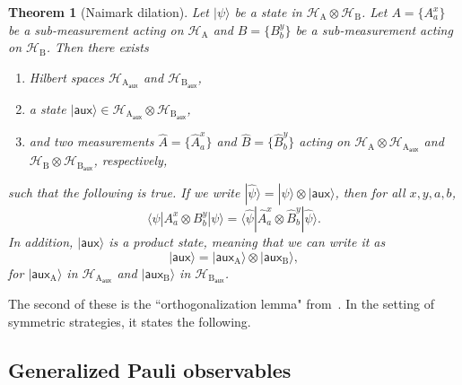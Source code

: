 \documentclass[11pt]{article}
\newtheorem{theorem}{Theorem}[section]
\theoremstyle{definition}
\newcommand{\ket}[1]{|#1\rangle}
\newcommand{\bra}[1]{\langle#1|}
\newcommand{\ot}{\otimes}
\newcommand{\mH}{\ensuremath{\mathcal{H}}}
\begin{document}
\begin{theorem}[Naimark dilation]\label{thm:naimark}
Let $\ket{\psi}$ be a state in $\mH_{\mathrm{A}} \ot \mH_{\mathrm{B}}$.
Let $A = \{A^x_a\}$ be a sub-measurement acting on $\mH_{\mathrm{A}}$
and $B=\{B^y_b\}$ be a sub-measurement acting on $\mH_{\mathrm{B}}$.
Then there exists
\begin{enumerate}
\item Hilbert spaces $\mH_{\mathrm{A}_{\mathsf{aux}}}$ and $\mH_{\mathrm{B}_{\mathsf{aux}}}$,
\item a state $\ket{\mathsf{aux}} \in \mH_{\mathrm{A}_{\mathsf{aux}}} \ot \mH_{\mathrm{B}_{\mathsf{aux}}}$,
\item and two measurements  $\widehat{A} = \{\widehat{A}^x_a\}$ and $\widehat{B}=\{\widehat{B}^y_b\}$
acting on $\mH_{\mathrm{A}} \ot \mH_{\mathrm{A}_{\mathsf{aux}}}$
and $\mH_{\mathrm{B}} \ot \mH_{\mathrm{B}_{\mathsf{aux}}}$,
respectively,
\end{enumerate}
such that the following is true.
If we write $\ket{\widehat{\psi}} = \ket{\psi} \otimes \ket{\mathsf{aux}}$,
then for all $x,y, a, b$,
 \begin{equation*}
 \bra{\psi} A^x_a \ot B^y_b \ket{\psi}
 = \bra{\widehat{\psi}} \widehat{A}^x_a \ot \widehat{B}^y_b \ket{\widehat{\psi}}.
 \end{equation*}
 In addition, $\ket{\mathsf{aux}}$ is a \emph{product state},
 meaning that we can write it as
 \begin{equation*}
 \ket{\mathsf{aux}}= \ket{\mathsf{aux}_{\mathrm{A}}} \ot \ket{\mathsf{aux}_{\mathrm{B}}},
 \end{equation*}
for $\ket{\mathsf{aux}_{\mathrm{A}}}$ in $\mH_{\mathrm{A}_{\mathsf{aux}}}$
and $\ket{\mathsf{aux}_{\mathrm{B}}}$ in $\mH_{\mathrm{B}_{\mathsf{aux}}}$.
\end{theorem}
The second of these is the ``orthogonalization lemma" from~\cite{KV11}.
In the setting of symmetric strategies, it states the following.















\subsection{Generalized Pauli observables}
\label{sec:generalized-pauli}
\end{document}
